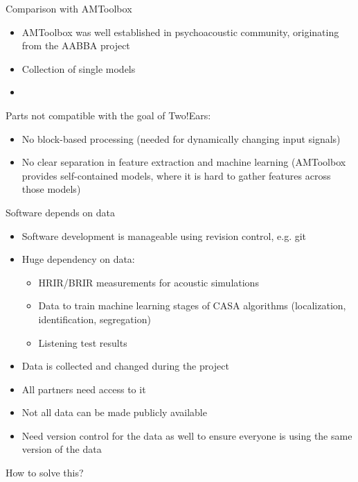 \documentclass{beamer}
\begin{document}
\begin{frame}{Comparison with AMToolbox}

    \begin{itemize}
        \item AMToolbox was well established in psychoacoustic community,
            originating from the AABBA project
        \item Collection of single models
        \item 
    \end{itemize}

    Parts not compatible with the goal of Two!Ears:
    \begin{itemize}
        \item No block-based processing (needed for dynamically changing input
            signals)
        \item No clear separation in feature extraction and machine learning
            (AMToolbox provides self-contained models, where it is hard to
            gather features across those models)
    \end{itemize}

\end{frame}

\begin{frame}{Software depends on data}

    \begin{itemize}
        \item Software development is manageable using revision control, e.g. git
        \item Huge dependency on data:
            \begin{itemize}
                \item HRIR/BRIR measurements for acoustic simulations
                \item Data to train machine learning stages of CASA algorithms
                    (localization, identification, segregation)
                \item Listening test results
            \end{itemize}
        \item Data is collected and changed during the project
        \item All partners need access to it
        \item Not all data can be made publicly available
        \item Need version control for the data as well to ensure everyone is
            using the same version of the data
    \end{itemize}

    How to solve this?

\end{frame}
\end{document}
